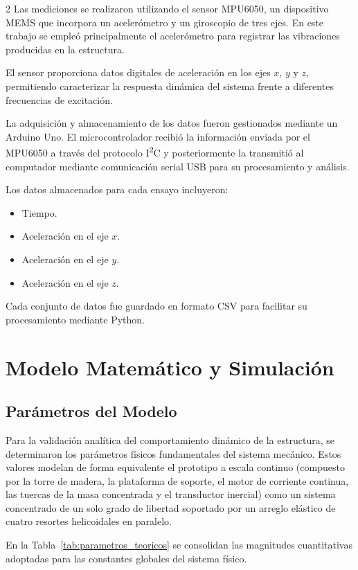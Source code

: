 \documentclass[10pt]{article}
\begin{document}
\begin{multicols}{2}
Las mediciones se realizaron utilizando el sensor MPU6050, un dispositivo MEMS que incorpora un acelerómetro y un giroscopio de tres ejes. En este trabajo se empleó principalmente el acelerómetro para registrar las vibraciones producidas en la estructura.

El sensor proporciona datos digitales de aceleración en los ejes $x$, $y$ y $z$, permitiendo caracterizar la respuesta dinámica del sistema frente a diferentes frecuencias de excitación.

La adquisición y almacenamiento de los datos fueron gestionados mediante un Arduino Uno. El microcontrolador recibió la información enviada por el MPU6050 a través del protocolo I\textsuperscript{2}C y posteriormente la transmitió al computador mediante comunicación serial USB para su procesamiento y análisis.

Los datos almacenados para cada ensayo incluyeron:

\begin{itemize}
    \item Tiempo.
    \item Aceleración en el eje $x$.
    \item Aceleración en el eje $y$.
    \item Aceleración en el eje $z$.
\end{itemize}

Cada conjunto de datos fue guardado en formato CSV para facilitar su procesamiento mediante Python.
\section{Modelo Matemático y Simulación}

\subsection{Parámetros del Modelo}

Para la validación analítica del comportamiento dinámico de la estructura, se determinaron los parámetros físicos fundamentales del sistema mecánico. Estos valores modelan de forma equivalente el prototipo a escala continuo (compuesto por la torre de madera, la plataforma de soporte, el motor de corriente continua, las tuercas de la masa concentrada y el transductor inercial) como un sistema concentrado de un solo grado de libertad soportado por un arreglo elástico de cuatro resortes helicoidales en paralelo.

En la Tabla~\ref{tab:parametros_teoricos} se consolidan las magnitudes cuantitativas adoptadas para las constantes globales del sistema físico.


\end{multicols}
\end{document}
